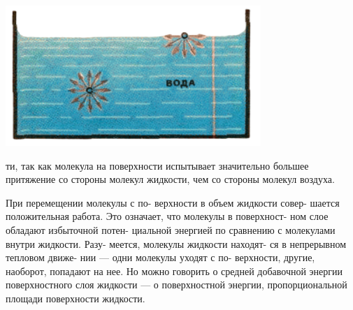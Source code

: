\documentclass{article}
\begin{document}
\begin{multicols}{2}
\begin{Figure}
 \centering
  \includegraphics[width=\linewidth]{pic1.png}
  \begin{flushright}
  \end{flushright}
  \label{ris:image}
\end{Figure}

\large
\noindent
ти, так как молекула на поверхности\linebreak
испытывает значительно большее\linebreak
притяжение со стороны молекул\linebreak
жидкости, чем со стороны молекул\linebreak
воздуха.

При перемещении молекулы с по-\linebreak
верхности в объем жидкости совер-\linebreak
шается положительная работа. Это\linebreak
означает, что молекулы в поверхност-\linebreak
ном слое обладают избыточной потен-\linebreak
циальной энергией по сравнению с\linebreak
молекулами внутри жидкости. Разу-\linebreak
меется, молекулы жидкости находят-\linebreak
ся в непрерывном тепловом движе-\linebreak
нии — одни молекулы уходят с по-\linebreak
верхности, другие, наоборот, попадают\linebreak
на нее. Но можно говорить о средней\linebreak
добавочной энергии поверхностного\linebreak
слоя жидкости — о поверхностной\linebreak
энергии, пропорциональной площади\linebreak
поверхности жидкости.


\end{multicols}
\end{document}
